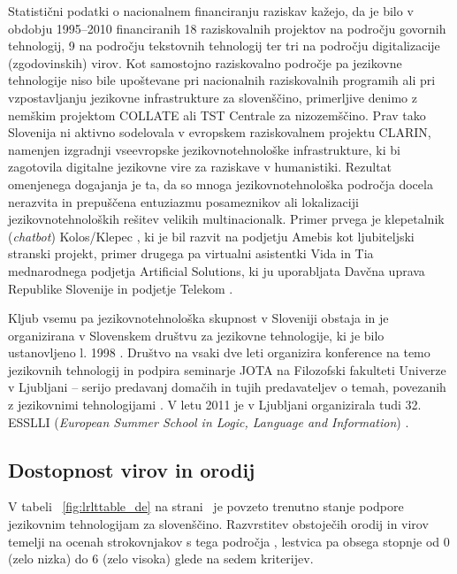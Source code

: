 \begin{multicols}{2}
Statistični podatki o nacionalnem financiranju raziskav kažejo, da je bilo v obdobju 1995--2010 financiranih 18 raziskovalnih projektov na področju go\-vornih tehnologij, 9 na področju teks\-tovnih tehnologij ter tri na področju digitalizacije (zgodovinskih) virov. Kot samostojno raziskovalno področje pa jezikovne tehnologije niso bile upoštevane pri nacionalnih raziskovalnih programih ali pri vzpostav\-ljanju jezikovne infrastrukture za slovenščino, primerljive denimo z nemškim projektom COLLATE ali TST Centrale za nizozemščino. Prav tako Slovenija ni aktivno sodelovala v evropskem raziskovalnem projektu CLARIN, namenjen izgradnji vseevropske jezikovnotehnološke infrastrukture, ki bi zagotovila digitalne jezikovne vire za raziskave v humanistiki. Rezultat omenjenega dogajanja je ta, da so mnoga jezikovnotehnološka področja docela ne\-razvita in prepuščena entuziazmu posameznikov ali lokalizaciji jezikovnotehnoloških rešitev velikih multinacionalk. Primer prvega je klepetalnik (\textit{chatbot}) Kolos/Klepec \cite{Amb7}, ki je bil razvit na podjetju Amebis kot ljubiteljski stranski projekt,  primer drugega pa virtualni asistentki Vida in Tia mednaro\-dnega podjetja Artificial Solutions, ki ju uporab\-ljata Davčna uprava Republike Slovenije in podjetje Telekom \cite{Chat1}. 

Kljub vsemu pa jezikovnotehnološka skupnost v Sloveniji obstaja in je organizirana v Slovenskem društvu za jezikovne tehnologije, ki je bilo ustanov\-ljeno l. 1998 \cite{SDJT1}.  Društvo na vsaki dve leti organizira konference na temo jezikovnih tehnologij in podpira seminarje JOTA na Filozofski fakulteti Univerze v Ljub\-ljani – serijo predavanj domačih in tujih predavateljev o temah, povezanih z jezikov\-nimi tehnologijami \cite{Jota1}. V letu 2011 je v Ljub\-ljani organizirala tudi 32. ESSLLI (\textit{European Summer School in Logic, Language and Information}) \cite{ESSLLI1}. 

\subsection{Dostopnost virov in orodij}

V tabeli ~\ref{fig:lrlttable_de} na strani~\pageref{fig:lrlttable_de} je povzeto trenutno stanje podpore jezikovnim tehnologijam za slovenščino. Razvrstitev obstoječih orodij in virov temelji na ocenah strokovnjakov s tega področja \cite{expert1}, lestvica pa obsega stopnje od 0 (zelo nizka) do 6 (zelo visoka) glede na sedem kriterijev. 


\end{multicols}
